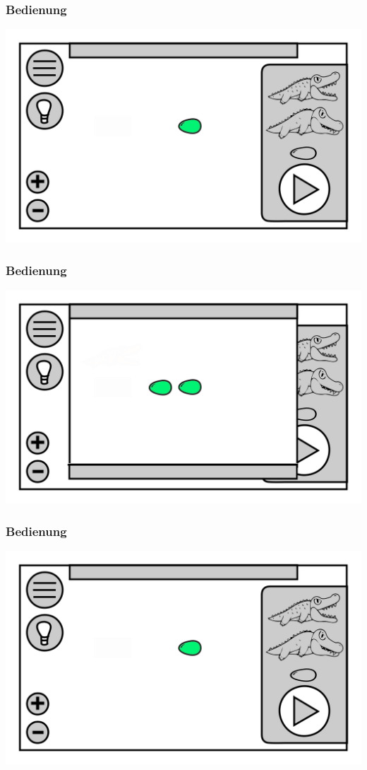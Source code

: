 \documentclass[t]{beamer}
\begin{document}
\begin{frame}
	\frametitle{Bedienung}
	\includegraphics[height=\textheight]{level_start.png}
\end{frame}
\begin{frame}
	\frametitle{Bedienung}
	\includegraphics[height=\textheight]{level_end.png}
\end{frame}
\begin{frame}
	\frametitle{Bedienung}
	\includegraphics[height=\textheight]{level_start.png}
\end{frame}
\end{document}

